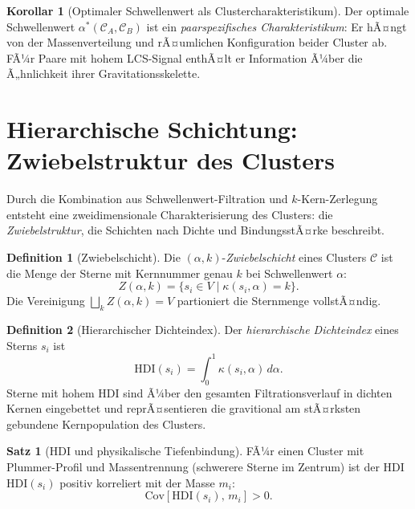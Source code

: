 ﻿\documentclass[a4paper,12pt]{report}
\theoremstyle{definition}
\newtheorem{definition}{Definition}
\newtheorem{satz}{Satz}
\newtheorem{korollar}{Korollar}
\begin{document}
\begin{korollar}[Optimaler Schwellenwert als Clustercharakteristikum]
\label{kor:opt_alpha}
Der optimale Schwellenwert $\alpha^*(\mathcal{C}_A, \mathcal{C}_B)$ ist ein \emph{paarspezifisches Charakteristikum}: Er hÃ¤ngt von der Massenverteilung und rÃ¤umlichen Konfiguration beider Cluster ab. FÃ¼r Paare mit hohem LCS-Signal enthÃ¤lt er Information Ã¼ber die Ã„hnlichkeit ihrer Gravitationsskelette.
\end{korollar}

\section{Hierarchische Schichtung: Zwiebelstruktur des Clusters}
\label{sec:zwiebelstruktur}

Durch die Kombination aus Schwellenwert-Filtration und $k$-Kern-Zerlegung entsteht eine zweidimensionale Charakterisierung des Clusters: die \emph{Zwiebelstruktur}, die Schichten nach Dichte und BindungsstÃ¤rke beschreibt.

\begin{definition}[Zwiebelschicht]
\label{def:zwiebelschicht}
Die $(\alpha, k)$-\emph{Zwiebelschicht} eines Clusters $\mathcal{C}$ ist die Menge der Sterne mit Kernnummer genau $k$ bei Schwellenwert $\alpha$:
\[
Z(\alpha, k) = \{s_i \in V \mid \kappa(s_i, \alpha) = k\}.
\]
Die Vereinigung $\bigsqcup_k Z(\alpha, k) = V$ partioniert die Sternmenge vollstÃ¤ndig.
\end{definition}

\begin{definition}[Hierarchischer Dichteindex]
\label{def:dichteindex}
Der \emph{hierarchische Dichteindex} eines Sterns $s_i$ ist
\[
\mathrm{HDI}(s_i) = \int_0^1 \kappa(s_i, \alpha)\, d\alpha.
\]
Sterne mit hohem HDI sind Ã¼ber den gesamten Filtrationsverlauf in dichten Kernen eingebettet und reprÃ¤sentieren die gravitional am stÃ¤rksten gebundene Kernpopulation des Clusters.
\end{definition}

\begin{satz}[HDI und physikalische Tiefenbindung]
\label{satz:HDI}
FÃ¼r einen Cluster mit Plummer-Profil und Massentrennung (schwerere Sterne im Zentrum) ist der HDI $\mathrm{HDI}(s_i)$ positiv korreliert mit der Masse $m_i$:
\[
\mathrm{Cov}[\mathrm{HDI}(s_i),\, m_i] > 0.
\]
\end{satz}
\end{document}
